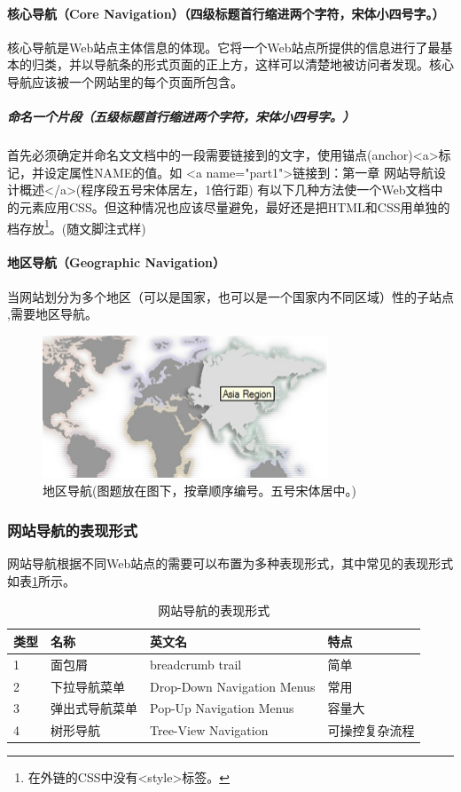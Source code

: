\paragraph{核心导航（Core Navigation）（四级标题首行缩进两个字符，宋体小四号字。）} 
\par 核心导航是Web站点主体信息的体现。它将一个Web站点所提供的信息进行了最基本的归类，并以导航条的形式页面的正上方，这样可以清楚地被访问者发现。核心导航应该被一个网站里的每个页面所包含。
\subparagraph{命名一个片段（五级标题首行缩进两个字符，宋体小四号字。）}
\par 首先必须确定并命名文文档中的一段需要链接到的文字，使用锚点(anchor)<a>标记，并设定属性NAME的值。如
<a name="part1">链接到：第一章 网站导航设计概述</a>(程序段五号宋体居左，1倍行距)
有以下几种方法使一个Web文档中的元素应用CSS。但这种情况也应该尽量避免，最好还是把HTML和CSS用单独的档存放\footnote{在外链的CSS中没有<style>标签。}。(随文脚注式样)
\paragraph{地区导航（Geographic Navigation）}
\par 当网站划分为多个地区（可以是国家，也可以是一个国家内不同区域）性的子站点\citep{宫琳2017基于专利信息的产品方案竞争力评价方法} ,需要地区导航。

\newpage
\begin {figure}[htbp]
\centering
\includegraphics {figures/figure-example.jpg}
\caption{\songti {}地区导航(图题放在图下，按章顺序编号。五号宋体居中。)}
\label{fig:figure-example}
\end{figure}

\subsubsection{网站导航的表现形式}
\par 网站导航根据不同Web站点的需要可以布置为多种表现形式，其中常见的表现形式如表\ref{tab:1}所示。
\begin{table}[htbp]
\centering
\caption{\heiti {}网站导航的表现形式}
\label{tab:1}
\begin{tabular}{llll}
	\toprule
	类型  &名称  &  英文名  & 特点  \\
	\midrule
	1  &    面包屑  &  breadcrumb trail & 简单 \\
	2  &  下拉导航菜单  & Drop-Down Navigation Menus  & 常用 \\
	3  &   弹出式导航菜单  &  Pop-Up Navigation Menus &  容量大 \\
	4  &  树形导航  &  Tree-View Navigation & 可操控复杂流程 \\
	\bottomrule
\end{tabular}
\end{table}
	
